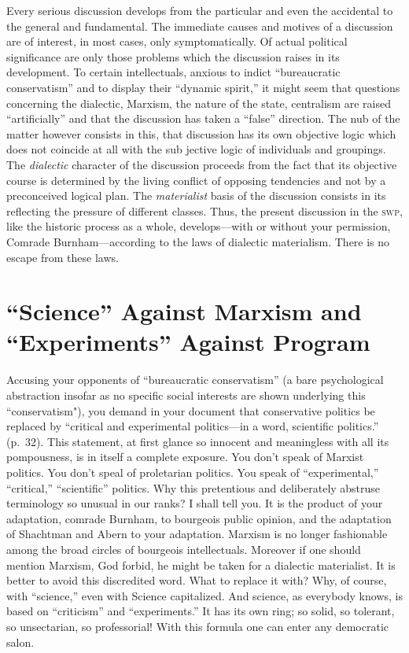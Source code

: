 Every serious discussion develops from the particular and even the accidental to the general and fundamental. The immediate causes and motives of a discussion are of interest, in most cases, only symptomatically. Of actual political significance are only those problems which the discussion raises in its development. To certain intellectuals, anxious to indict ``bureaucratic conservatism” and to display their “dynamic spirit,” it might seem that questions concerning the dialectic, Marxism, the nature of the state, centralism are raised “artificially” and that the discussion has taken a “false” direction. The nub of the matter however consists in this, that discussion has its own objective logic which does not coincide at all with the sub jective logic of individuals and groupings. The \emph{dialectic} character of the discussion proceeds from the fact that its objective course is determined by the living conflict of opposing tendencies and not by a preconceived logical plan. The \emph{materialist} basis of the discussion consists in its reflecting the pressure of different classes. Thus, the present discussion in the \textsc{swp}, like the historic process as a whole, develops---with or without your permission, Comrade Burnham---according to the laws of dialectic materialism. There is no escape from these laws.

\section*{“Science” Against Marxism and “Experiments” Against Program}

Accusing your opponents of “bureaucratic conservatism” (a bare psychological abstraction insofar as no specific social interests are shown underlying this “conservatism"), you demand in your document that conservative politics be replaced by “critical and experimental politics---in a word, scientific politics.” (p.~32). This statement, at first glance so innocent and meaningless with all its pompousness, is in itself a complete exposure. You don’t speak of Marxist politics. You don’t speal of proletarian politics. You speak of “experimental,” “critical,” “scientific” politics. Why this pretentious and deliberately abstruse terminology so unusual in our ranks? I shall tell you. It is the product of your adaptation, comrade Burnham, to bourgeois public opinion, and the adaptation of Shachtman and Abern to your adaptation. Marxism is no longer fashionable among the broad circles of bourgeois intellectuals. Moreover if one should mention Marxism, God forbid, he might be taken for a dialectic materialist. It is better to avoid this discredited word. What to replace it with? Why, of course, with “science,” even with Science capitalized. And science, as everybody knows, is based on “criticism” and “experiments.” It has its own ring; so solid, so tolerant, so unsectarian, so professorial! With this formula one can enter any democratic salon.

